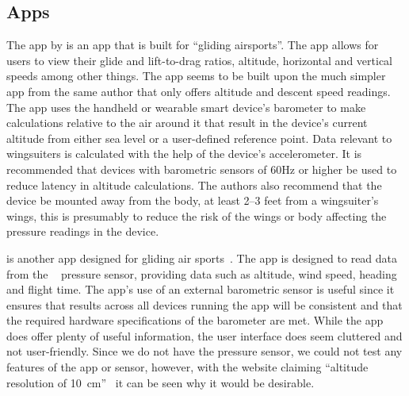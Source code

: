 \documentclass[11pt, a4paper, twocolumn]{article}
\begin{document}
\subsection{Apps}\label{sec:apps} %

The  app by \textcite{pfm_technologies_llc_l/d_2015} is an app that is built for ``gliding airsports''. The app allows for users to view their glide and lift-to-drag ratios, altitude, horizontal and vertical speeds among other things. The app seems to be built upon the much simpler  app from the same author that only offers altitude and descent speed readings.
The  app uses the handheld or wearable smart device's barometer to make calculations relative to the air around it that result in the device's current altitude from either sea level or a user-defined reference point. Data relevant to wingsuiters is calculated with the help of the device's accelerometer. It is recommended that devices with barometric sensors of 60Hz or higher be used to reduce latency in altitude calculations. The authors also recommend that the device be mounted away from the body, at least 2--3 feet from a wingsuiter's wings, this is presumably to reduce the risk of the wings or body affecting the pressure readings in the device.

 is another app designed for gliding air sports~\cite{dickie_blueflyvario_2016}. The app is designed to read data from the ~\cite{noauthor_blueflyvario_nodate} pressure sensor, providing data such as altitude, wind speed, heading and flight time.
The app's use of an external barometric sensor is useful since it ensures that results across all devices running the app will be consistent and that the required hardware specifications of the barometer are met.
While the app does offer plenty of useful information, the user interface does seem cluttered and not user-friendly. Since we do not have the  pressure sensor, we could not test any features of the app or sensor, however, with the website claiming ``altitude resolution of \SI{10}{\centi\metre}''~\cite{noauthor_blueflyvario_nodate} it can be seen why it would be desirable.
\end{document}
